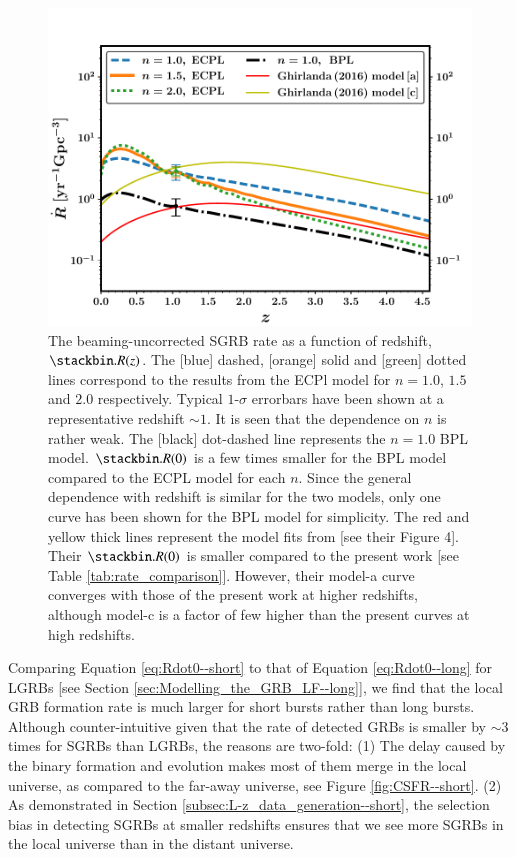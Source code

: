 \begin{figure}
\begin{center}
\includegraphics[scale=0.6]{Rdot_of_z}
\caption[The beaming-uncorrected SGRB rate as a function of redshift]{The beaming-uncorrected SGRB rate as a function of redshift, $\Rcap(z)$. The [blue] dashed, [orange] solid and [green] dotted lines correspond to the results from the ECPl model for $n = 1.0$, $1.5$ and $2.0$ respectively. Typical $1$-$\sigma$ errorbars have been shown at a representative redshift $\sim 1$. It is seen that the dependence on $n$ is rather weak. The [black] dot-dashed line represents the $n = 1.0$ BPL model. $\Rcap(0)$ is a few times smaller for the BPL model compared to the ECPL model for each $n$. Since the general dependence with redshift is similar for the two models, only one curve has been shown for the BPL model for simplicity. The red and yellow thick lines represent the model fits from  [see their Figure 4]. Their $\Rcap(0)$ is smaller compared to the present work [see Table \ref{tab:rate_comparison}]. However, their model-a curve converges with those of the present work at higher redshifts, although model-c is a factor of few higher than the present curves at high redshifts.}
\label{fig:Rdot_of_z--short}
\end{center}
\end{figure}


Comparing Equation \ref{eq:Rdot0--short} to that of Equation \ref{eq:Rdot0--long} for LGRBs [see Section \ref{sec:Modelling_the_GRB_LF--long}], we find that the local GRB formation rate is much larger for short bursts rather than long bursts. Although counter-intuitive given that the rate of detected GRBs is smaller by $\sim 3$ times for SGRBs than LGRBs, the reasons are two-fold: (1) The delay caused by the binary formation and evolution makes most of them merge in the local universe, as compared to the far-away universe, see Figure \ref{fig:CSFR--short}. (2) As demonstrated in Section \ref{subsec:L-z_data_generation--short}, the selection bias in detecting SGRBs at smaller redshifts ensures that we see more SGRBs in the local universe than in the distant universe.


